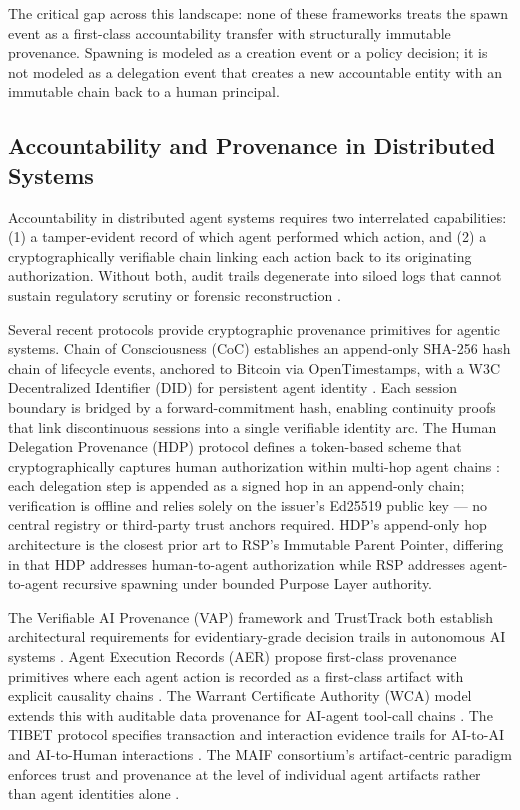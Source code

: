 The critical gap across this landscape: none of these frameworks treats the spawn event as a first-class accountability transfer with structurally immutable provenance. Spawning is modeled as a creation event or a policy decision; it is not modeled as a delegation event that creates a new accountable entity with an immutable chain back to a human principal.

\subsection{Accountability and Provenance in Distributed Systems}

Accountability in distributed agent systems requires two interrelated capabilities: (1) a tamper-evident record of which agent performed which action, and (2) a cryptographically verifiable chain linking each action back to its originating authorization. Without both, audit trails degenerate into siloed logs that cannot sustain regulatory scrutiny or forensic reconstruction \cite{vap2026,trusttrack2025}.

Several recent protocols provide cryptographic provenance primitives for agentic systems. Chain of Consciousness (CoC) establishes an append-only SHA-256 hash chain of lifecycle events, anchored to Bitcoin via OpenTimestamps, with a W3C Decentralized Identifier (DID) for persistent agent identity \cite{chainofconsciousness2026}. Each session boundary is bridged by a forward-commitment hash, enabling continuity proofs that link discontinuous sessions into a single verifiable identity arc. The Human Delegation Provenance (HDP) protocol defines a token-based scheme that cryptographically captures human authorization within multi-hop agent chains \cite{hdp2026}: each delegation step is appended as a signed hop in an append-only chain; verification is offline and relies solely on the issuer's Ed25519 public key — no central registry or third-party trust anchors required. HDP's append-only hop architecture is the closest prior art to RSP's Immutable Parent Pointer, differing in that HDP addresses human-to-agent authorization while RSP addresses agent-to-agent recursive spawning under bounded Purpose Layer authority.

The Verifiable AI Provenance (VAP) framework and TrustTrack both establish architectural requirements for evidentiary-grade decision trails in autonomous AI systems \cite{vap2026,trusttrack2025}. Agent Execution Records (AER) propose first-class provenance primitives where each agent action is recorded as a first-class artifact with explicit causality chains \cite{aer2025}. The Warrant Certificate Authority (WCA) model extends this with auditable data provenance for AI-agent tool-call chains \cite{wca2025}. The TIBET protocol specifies transaction and interaction evidence trails for AI-to-AI and AI-to-Human interactions \cite{tibet2026}. The MAIF consortium's artifact-centric paradigm enforces trust and provenance at the level of individual agent artifacts rather than agent identities alone \cite{maif2025}.

